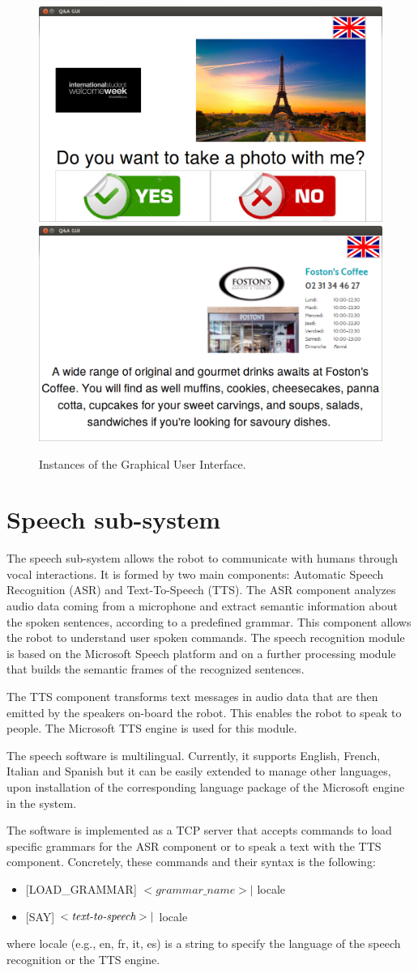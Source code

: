 \documentclass[11pt,a4paper]{article}
\begin{document}
\begin{figure}[!t]
\centering
\includegraphics[width=.45\columnwidth]{img/erasmus_wantphoto.png}
\includegraphics[width=.45\columnwidth]{img/fostons.png}
\caption{Instances of the Graphical User Interface.}
\label{fig:GUIInstances}
\end{figure}

\section{Speech sub-system}
\label{sec:speech}
The speech sub-system allows the robot to communicate with humans through vocal interactions. It is
formed by two main components: Automatic Speech Recognition (ASR) and Text-To-Speech (TTS).
The ASR component analyzes audio data coming from a microphone and extract semantic information about the spoken sentences, according to a predefined grammar. This component allows the robot to understand user spoken commands. The speech recognition module is based on the Microsoft Speech platform and on a further processing module that builds the semantic frames of the recognized sentences.

The TTS component transforms text messages in audio data that are then emitted by the speakers
on-board the robot. This enables the robot to speak to people. The Microsoft TTS engine is used for
this module.

The speech software is multilingual. Currently, it supports English, French, Italian and Spanish but it can be easily extended to manage other languages, upon installation of the corresponding language package of the Microsoft engine in the system.

The software is implemented as a TCP server that accepts commands to load specific grammars for the ASR component or to speak a text with the TTS component.
Concretely, these commands and their syntax is the following:
\begin{itemize}
\item {[LOAD\_GRAMMAR]} $<grammar\_name> |$ locale
\item {[SAY]} $<\emph{text-to-speech}> |$ locale
\end{itemize}
where locale (e.g., en, fr, it, es) is a string to specify the language of the speech recognition or the TTS engine.
\end{document}

